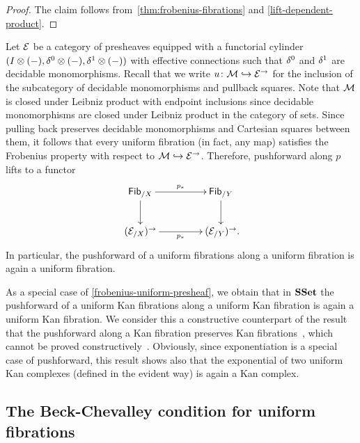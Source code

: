 \documentclass[reqno,10pt,a4paper,oneside]{amsart}
\begin{document}
\begin{proof} The claim follows from~\cref{thm:frobenius-fibrations} and \cref{lift-dependent-product}.
\end{proof}

\begin{example} \label{frobenius-uniform-presheaf}
Let $\catE$ be a category of presheaves equipped with a functorial cylinder $(\interval \otimes (-), \lcyl \otimes (-), \rcyl \otimes (-))$ with effective connections such that $\lcyl$ and $\rcyl$ are decidable monomorphisms.
Recall that we write $u \co \cal{M} \hookrightarrow \catE^\to$ for the inclusion of the subcategory of decidable monomorphisms and pullback squares.
Note that $\cal{M}$ is closed under Leibniz product with endpoint inclusions since decidable monomorphisms are closed under Leibniz product in the category of sets.
Since pulling back preserves decidable monomorphisms and Cartesian squares between them, it follows that every uniform fibration (in fact, any map) satisfies the Frobenius property with respect to $\cal{M} \hookrightarrow \catE^\to$.
Therefore, pushforward along $p$ lifts to a functor
\[
\xymatrix@C+2em{
  \mathsf{Fib}_{/X} \ar[r]^{p_*} \ar[d]_{} & \mathsf{Fib}_{/Y} \ar[d] \\
  (\cal{E}_{/X})^\to \ar[r]_{p_*} & (\cal{E}_{/Y})^\to \rlap{.}
}
\]
In particular, the pushforward of a uniform fibrations along a uniform fibration is again a uniform fibration.
\end{example}

\begin{example} As a special case of \cref{frobenius-uniform-presheaf}, we obtain that in $\SSet$ the pushforward of a uniform Kan fibrations along a uniform Kan fibration is again a uniform Kan fibration.
We consider this a constructive counterpart of the result that the pushforward along a Kan fibration preserves Kan fibrations~\cite{voevodsky-simplicial-model}, which cannot be proved constructively~\cite{coquand-non-constructivity-kan}.
Obviously, since exponentiation is a special case of pushforward, this result shows also that the exponential of two uniform Kan complexes (defined in the evident way) is again a Kan complex.
\end{example}


\subsection*{The Beck-Chevalley condition for uniform fibrations}
\end{document}
